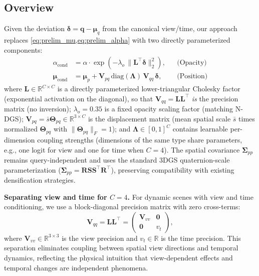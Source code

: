 \documentclass{article}
\theoremstyle{plain}
\theoremstyle{definition}
\theoremstyle{remark}
\begin{document}
\subsection{Overview}
\label{subsec:overview}

Given the deviation $\boldsymbol{\delta} = \mathbf{q} - \boldsymbol{\mu}_q$ from the canonical view/time, our approach replaces \cref{eq:prelim_mu,eq:prelim_alpha} with two directly parameterized components:
\begin{align}
\alpha_{\text{cond}} &= \alpha \cdot \exp\!\left(-\lambda_o\,\|\mathbf{L}^\top\boldsymbol{\delta}\|_2^2\right), & &\text{(Opacity)} \label{eq:direct_alpha}\\
\boldsymbol{\mu}_{\text{cond}} &= \boldsymbol{\mu}_p + \mathbf{V}_{pq}\,\mathrm{diag}(\boldsymbol{\Lambda})\,\mathbf{V}_{qq}\,\boldsymbol{\delta}, & &\text{(Position)} \label{eq:direct_mu}
\end{align}
where $\mathbf{L} \in \mathbb{R}^{C \times C}$ is a directly parameterized lower-triangular Cholesky factor (exponential activation on the diagonal), so that $\mathbf{V}_{qq} = \mathbf{L}\mathbf{L}^\top$ \emph{is} the precision matrix (no inversion); $\lambda_o{=}0.35$ is a fixed opacity scaling factor (matching N-DGS); $\mathbf{V}_{pq} = \bar{s}\boldsymbol{\Theta}_{pq} \in \mathbb{R}^{3 \times C}$ is the displacement matrix (mean spatial scale $\bar{s}$ times normalized $\boldsymbol{\Theta}_{pq}$ with $\|\boldsymbol{\Theta}_{pq}\|_F = 1$); and $\boldsymbol{\Lambda} \in [0,1]^C$ contains learnable per-dimension coupling strengths (dimensions of the same type share parameters, e.g., one logit for view and one for time when $C=4$). The spatial covariance $\boldsymbol{\Sigma}_{pp}$ remains query-independent and uses the standard 3DGS quaternion-scale parameterization ($\boldsymbol{\Sigma}_{pp} = \mathbf{R}\mathbf{S}\mathbf{S}^\top \mathbf{R}^\top$), preserving compatibility with existing densification strategies.

\textbf{Separating view and time for $C=4$.} For dynamic scenes with view and time conditioning, we use a block-diagonal precision matrix with zero cross-terms:
\begin{equation}
\mathbf{V}_{qq} = \mathbf{L}\mathbf{L}^\top = \begin{pmatrix}
\mathbf{V}_{vv} & \mathbf{0} \\
\mathbf{0} & v_t
\end{pmatrix},
\end{equation}
where $\mathbf{V}_{vv} \in \mathbb{R}^{3 \times 3}$ is the view precision and $v_t \in \mathbb{R}$ is the time precision. This separation eliminates coupling between spatial view directions and temporal dynamics, reflecting the physical intuition that view-dependent effects and temporal changes are independent phenomena.
\end{document}
